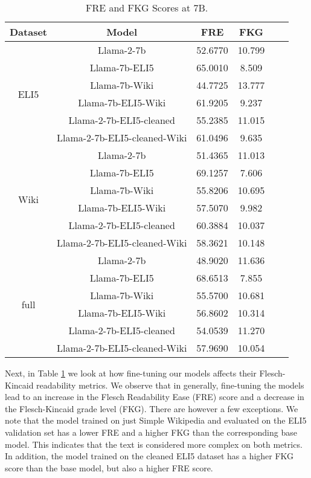 \documentclass[11pt, oneside]{article}   	%
\begin{document}
\begin{table}[h]
\centering
\begin{tabular}{cccccc}
\hline
Dataset & Model & FRE & FKG \\
\hline
\multirow{6}{*}{ELI5} & Llama-2-7b & 52.6770 & 10.799 \\
 & Llama-7b-ELI5 & 65.0010 & 8.509 \\
 & Llama-7b-Wiki & 44.7725 & 13.777 \\
 & Llama-7b-ELI5-Wiki & 61.9205 & 9.237 \\
  & Llama-2-7b-ELI5-cleaned & 55.2385 & 11.015 \\
 & Llama-2-7b-ELI5-cleaned-Wiki & 61.0496 & 9.635 \\
\hline
\multirow{6}{*}{Wiki} & Llama-2-7b & 51.4365 & 11.013 \\
 & Llama-7b-ELI5 & 69.1257 & 7.606 \\
 & Llama-7b-Wiki & 55.8206 & 10.695 \\
 & Llama-7b-ELI5-Wiki & 57.5070 & 9.982 \\
  & Llama-2-7b-ELI5-cleaned & 60.3884 & 10.037 \\
 & Llama-2-7b-ELI5-cleaned-Wiki & 58.3621 & 10.148 \\
\hline
\multirow{6}{*}{full} & Llama-2-7b & 48.9020 & 11.636 \\
 & Llama-7b-ELI5 & 68.6513 & 7.855 \\
 & Llama-7b-Wiki & 55.5700 & 10.681 \\
 & Llama-7b-ELI5-Wiki & 56.8602 & 10.314 \\
  & Llama-2-7b-ELI5-cleaned & 54.0539 & 11.270 \\
 & Llama-2-7b-ELI5-cleaned-Wiki & 57.9690 & 10.054 \\
\hline
\end{tabular}
\caption{FRE and FKG Scores at 7B.}
\label{tab:flesch_scores_7B}
\end{table}
Next, in Table \ref{tab:flesch_scores_7B} we look at how fine-tuning our models affects their Flesch-Kincaid readability metrics.
We observe that in generally, fine-tuning the models lead to an increase in the Flesch Readability Ease (FRE) score and a decrease in the Flesch-Kincaid grade level (FKG). 
There are however a few exceptions.
We note that the model trained on just Simple Wikipedia and evaluated on the ELI5 validation set has a lower FRE and a higher FKG than the corresponding base model.
This indicates that the text is considered more complex on both metrics.
In addition, the model trained on the cleaned ELI5 dataset has a higher FKG score than the base model, but also a higher FRE score.
\end{document}
